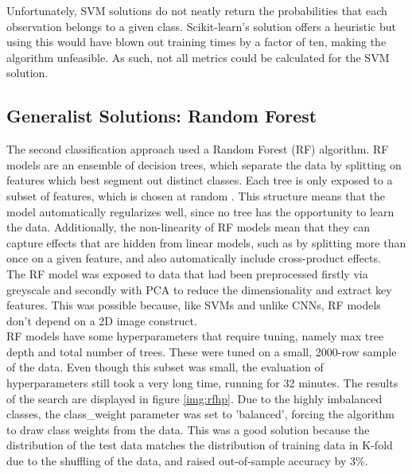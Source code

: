\documentclass[12pt]{article}
\begin{document}
Unfortunately, SVM solutions do not neatly return the probabilities that each observation belongs to a given class. Scikit-learn's solution offers a heuristic but using this would have blown out training times by a factor of ten, making the algorithm unfeasible. As such, not all metrics could be calculated for the SVM solution.\\


\subsection{Generalist Solutions: Random Forest}
The second classification approach used a Random Forest (RF) algorithm. RF models are an ensemble of decision trees, which separate the data by splitting on features which best segment out distinct classes. Each tree is only exposed to a subset of features, which is chosen at random \citep{rfimages}. This structure means that the model automatically regularizes well, since no tree has the opportunity to learn the data. Additionally, the non-linearity of RF models mean that they can capture effects that are hidden from linear models, such as by splitting more than once on a given feature, and also automatically include cross-product effects. \\

The RF model was exposed to data that had been preprocessed firstly via greyscale and secondly with PCA to reduce the dimensionality and extract key features. This was possible because, like SVMs and unlike CNNs, RF models don't depend on a 2D image construct.\\

RF models have some hyperparameters that require tuning, namely max tree depth and total number of trees. These were tuned on a small, 2000-row sample of the data. Even though this subset was small, the evaluation of hyperparameters still took a very long time, running for 32 minutes. The results of the search are displayed in figure \ref{img:rfhp}.  Due to the highly imbalanced classes, the class\_weight parameter was set to 'balanced', forcing the algorithm to draw class weights from the data. This was a good solution because the distribution of the test data matches the distribution of training data in K-fold due to the shuffling of the data, and raised out-of-sample accuracy by 3\%.\\
\end{document}
